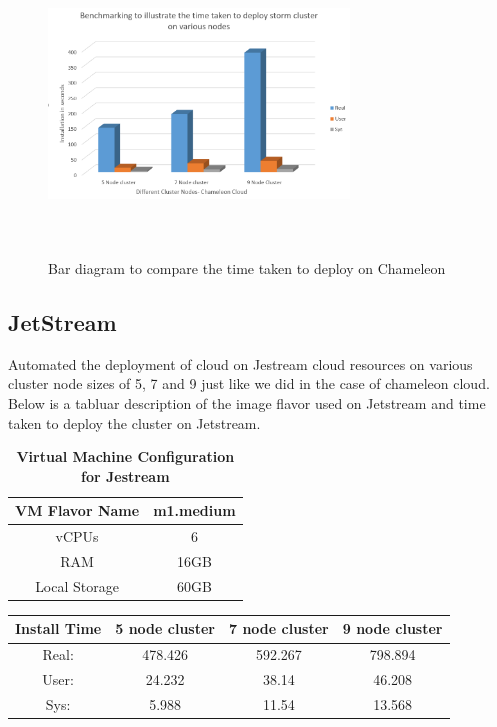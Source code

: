 \documentclass[9pt,twocolumn,twoside]{../../styles/osajnl}
\begin{document}
\begin{figure}[!htb]
  \includegraphics[width=8cm,height=8cm,keepaspectratio,width=\linewidth]{images/bar-1.png}
  \caption{Bar diagram to compare the time taken to deploy on Chameleon}
  \label{Bar diagram to compare the time taken to deploy on Chameleon}
\end{figure}

\subsection{JetStream}

Automated the deployment of cloud on Jestream cloud resources on various cluster node sizes of 5, 7 and 9 just like we did in the case of chameleon cloud. Below is a tabluar description of the image flavor used on Jetstream and time taken to deploy the cluster on Jetstream.


\begin{table}[htbp]
\centering
\caption{\bf Virtual Machine Configuration for Jestream}

 \begin{tabular} {| c | c |}

 \hline
VM Flavor Name   & m1.medium  \\
\hline
vCPUs & 6  \\
 \hline
RAM & 16GB   \\
 \hline
Local Storage & 60GB \\
\hline
\end{tabular}
  \label{tab:cloud-comparison}
\end{table}



\begin{center}
 \begin{tabular}{|c|| c c c|} 
 \hline
 Install Time &  5 node cluster & 7 node cluster & 9 node cluster\\ [0.5ex]
 \hline\hline
 Real: & 478.426 & 592.267 & 798.894 \\ 
 \hline
 User: & 24.232 & 38.14 & 46.208 \\
 \hline
 Sys: & 5.988 & 11.54 & 13.568 \\
 \hline
\end{tabular}
\end{center}
\end{document}
